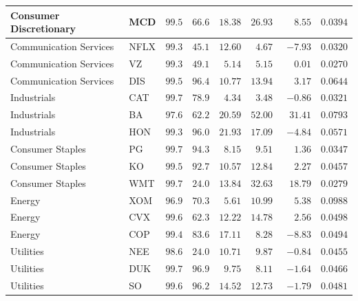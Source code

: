 \begin{table}[!ht]
\begin{tabular}{l l r r r r r r}
Consumer Discretionary  & MCD  & $99.5$ & $66.6$ & $18.38$            & $26.93$            & $\phantom{-}8.55$  & $0.0394$ \\
\midrule
Communication Services  & NFLX & $99.3$ & $45.1$ & $12.60$            & $\phantom{0}4.67$  & $-7.93$            & $0.0320$ \\
Communication Services  & VZ   & $99.3$ & $49.1$ & $\phantom{0}5.14$  & $\phantom{0}5.15$  & $\phantom{-}0.01$  & $0.0270$ \\
Communication Services  & DIS  & $99.5$ & $96.4$ & $10.77$            & $13.94$            & $\phantom{-}3.17$  & $0.0644$ \\
\midrule
Industrials             & CAT  & $99.7$ & $78.9$ & $\phantom{0}4.34$  & $\phantom{0}3.48$  & $-0.86$            & $0.0321$ \\
Industrials             & BA   & $97.6$ & $62.2$ & $20.59$            & $52.00$            & $31.41$            & $0.0793$ \\
Industrials             & HON  & $99.3$ & $96.0$ & $21.93$            & $17.09$            & $-4.84$            & $0.0571$ \\
\midrule
Consumer Staples        & PG   & $99.7$ & $94.3$ & $\phantom{0}8.15$  & $\phantom{0}9.51$  & $\phantom{-}1.36$  & $0.0347$ \\
Consumer Staples        & KO   & $99.5$ & $92.7$ & $10.57$            & $12.84$            & $\phantom{-}2.27$  & $0.0457$ \\
Consumer Staples        & WMT  & $99.7$ & $24.0$ & $13.84$            & $32.63$            & $18.79$            & $0.0279$ \\
\midrule
Energy                  & XOM  & $96.9$ & $70.3$ & $\phantom{0}5.61$  & $10.99$            & $\phantom{-}5.38$  & $0.0988$ \\
Energy                  & CVX  & $99.6$ & $62.3$ & $12.22$            & $14.78$            & $\phantom{-}2.56$  & $0.0498$ \\
Energy                  & COP  & $99.4$ & $83.6$ & $17.11$            & $\phantom{0}8.28$  & $-8.83$            & $0.0494$ \\
\midrule
Utilities               & NEE  & $98.6$ & $24.0$ & $10.71$            & $\phantom{0}9.87$  & $-0.84$            & $0.0455$ \\
Utilities               & DUK  & $99.7$ & $96.9$ & $\phantom{0}9.75$  & $\phantom{0}8.11$  & $-1.64$            & $0.0466$ \\
Utilities               & SO   & $99.6$ & $96.2$ & $14.52$            & $12.73$            & $-1.79$            & $0.0481$ \\

\end{tabular}
\end{table}
